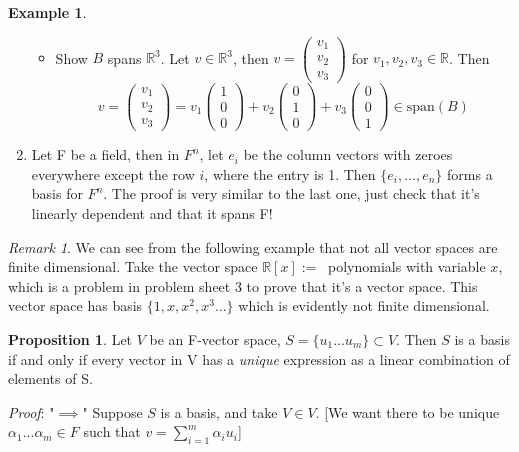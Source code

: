 \documentclass{report}
\theoremstyle{remark}
\newtheorem{remark}[theorem]{Remark}
\theoremstyle{definition}
\theoremstyle{definition}
\newtheorem{example}[theorem]{Example}
\theoremstyle{theorem}
\newtheorem{proposition}[theorem]{Proposition}
\renewcommand{\v}[1]{\mathbf{#1}}
\begin{document}
\begin{example}
\begin{enumerate}
\begin{itemize}
        \item Show $B$ spans $\mathbb{R}^3$. Let $v \in \mathbb{R}^3$, then $v = \begin{pmatrix}v_1\\v_2\\v_3\end{pmatrix}$ for $v_1, v_2, v_3 \in \mathbb{R}$. Then
        \[v= \begin{pmatrix}v_1\\v_2\\v_3\end{pmatrix} = v_1\begin{pmatrix}1\\0\\0\end{pmatrix} + v_2 \begin{pmatrix}0\\1\\0\end{pmatrix} + v_3 \begin{pmatrix}0\\0\\1\end{pmatrix} \in \text{span}(B)\]
    \end{itemize}
    \item Let F be a field, then in $F^n$, let $e_i$ be the column vectors with zeroes everywhere except the row $i$, where the entry is 1. Then $\{e_i,..., e_n\}$ forms a basis for $F^n$. The proof is very similar to the last one, just check that it's linearly dependent and that it spans F!
\end{enumerate}
\end{example}
\begin{remark}
We can see from the following example that not all vector spaces are finite dimensional. Take the vector space $\mathbb{R}[x] := \>$ polynomials with variable $x$, which is a problem in problem sheet 3 to prove that it's a vector space. This vector space has basis $\{ 1, x, x^2, x^3... \}$ which is evidently not finite dimensional.
\end{remark}
\begin{proposition}
Let $V$ be an F-vector space, $S = \{u_1 ... u_m\} \subset V$. Then $S$ is a basis if and only if every vector in V has a \emph{unique} expression as a linear combination of elements of S.
\end{proposition}
\emph{Proof}: "$\implies$" Suppose $S$ is a basis, and take $V \in V$. [We want there to be unique $\alpha_1... \alpha_m \in F$ such that $v = \sum^m_{i=1}\alpha_iu_i$]\\
\end{document}
